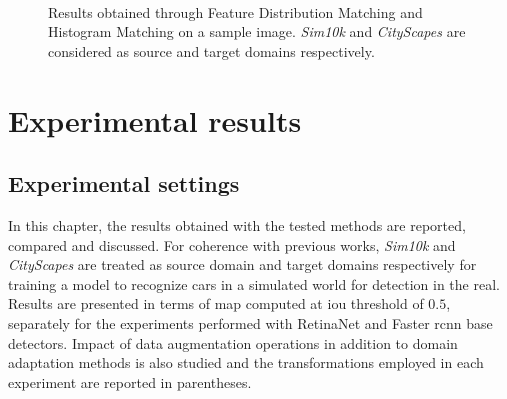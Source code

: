 \documentclass[%
    corpo=12pt,
    twoside,
    stile=classica,   
    tipotesi=magistrale,
    evenboxes,
    english
]{toptesi}
\begin{document}
\begin{figure}[ht!]
	\centering
	\\
	\caption{Results obtained through Feature Distribution Matching and Histogram Matching on a sample image. \textit{Sim10k} and \textit{CityScapes} are considered as source and target domains respectively.}
	\label{fig:kis}
\end{figure}



\chapter{Experimental results}
\section{Experimental settings}
In this chapter, the results obtained with the tested methods are reported, compared and discussed. For coherence with previous works, \textit{Sim10k} and \textit{CityScapes} are treated as source domain and target domains respectively for training a model to recognize cars in a simulated world for detection in the real. Results are presented in terms of \gls{map} computed at \gls{iou} threshold of $ 0.5 $, separately for the experiments performed with RetinaNet and Faster \gls{rcnn} base detectors. Impact of data augmentation operations in addition to domain adaptation methods is also studied and the transformations employed in each experiment are reported in parentheses.
\end{document}
